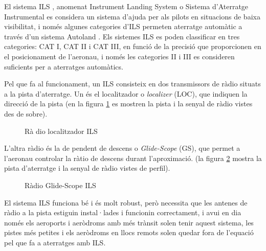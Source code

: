 \documentclass[10pt,a4paper,twocolumn,twoside]{article}
\begin{document}
El sistema ILS \cite{ILS}, anomenat Instrument Landing System o Sistema d'Aterratge Instrumental es considera un sistema d'ajuda per als pilots en situacions de baixa visibilitat, i només algunes categories d'ILS permeten aterratge automàtic a través
d'un sistema Autoland \cite{Autoland}.
Els sistemes ILS es poden classificar en tres categories: CAT I, CAT II i CAT III,
en funció de la precisió que proporcionen en el posicionament de l'aeronau, i només
les categories II i III es consideren suficients per a aterratges automàtics.

Pel que fa al funcionament, un ILS consisteix en dos transmissors de ràdio situats
a la pista d'aterratge. Un és el localitzador o \textit{localizer} (LOC), que 
indiquen la direcció de la pista (en la figura \ref{fig-ils-loc} es mostren la pista i la
senyal de ràdio vistes des de sobre).


\begin{figure}[!h]
\centering
{}
	\caption{Rà dio localitzador ILS}
	\label{fig-ils-loc}
\end{figure}

L'altra ràdio és la de pendent de descens o \textit{Glide-Scope} (GS), que permet a
l'aeronau controlar la ràtio de descens durant l'aproximació. (la figura \ref{fig-ils-gs} mostra la
pista d'aterratge i la senyal de ràdio vistes de perfil).

\begin{figure}[!h]
\centering
{}
	\caption{Ràdio Glide-Scope ILS}
	\label{fig-ils-gs}
\end{figure}

El sistema ILS funciona bé i és molt robust, però necessita que les antenes de ràdio
a la pista estiguin instal·lades i funcionin correctament, i avui en dia només els
aeroports i aeròdroms amb més trànsit solen tenir aquest sistema, les pistes més petites i els aeròdroms en llocs remots solen quedar fora de l'equació pel que fa a aterratges
amb ILS.
\end{document}
